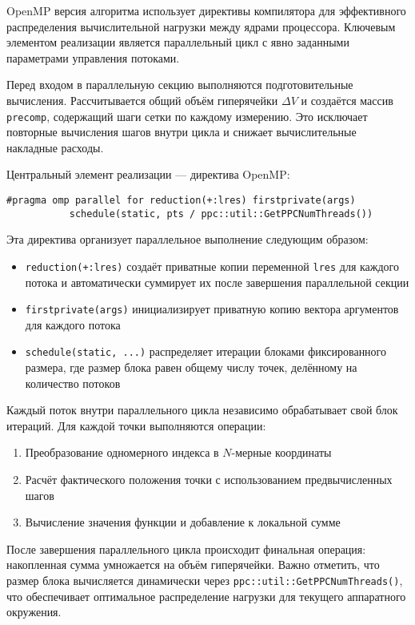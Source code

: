 \documentclass[12pt,a4paper]{extarticle}
\begin{document}
OpenMP версия алгоритма использует директивы компилятора для эффективного распределения вычислительной нагрузки между ядрами процессора. Ключевым элементом реализации является параллельный цикл с явно заданными параметрами управления потоками.

Перед входом в параллельную секцию выполняются подготовительные вычисления. Рассчитывается общий объём гиперячейки $\Delta V$ и создаётся массив \texttt{precomp}, содержащий шаги сетки по каждому измерению. Это исключает повторные вычисления шагов внутри цикла и снижает вычислительные накладные расходы.

Центральный элемент реализации — директива OpenMP:
\begin{verbatim}
#pragma omp parallel for reduction(+:lres) firstprivate(args) 
           schedule(static, pts / ppc::util::GetPPCNumThreads())
\end{verbatim}
Эта директива организует параллельное выполнение следующим образом:
\begin{itemize}
    \item \texttt{reduction(+:lres)} создаёт приватные копии переменной \texttt{lres} для каждого потока и автоматически суммирует их после завершения параллельной секции
    \item \texttt{firstprivate(args)} инициализирует приватную копию вектора аргументов для каждого потока
    \item \texttt{schedule(static, ...)} распределяет итерации блоками фиксированного размера, где размер блока равен общему числу точек, делённому на количество потоков
\end{itemize}

Каждый поток внутри параллельного цикла независимо обрабатывает свой блок итераций. Для каждой точки выполняются операции:
\begin{enumerate}
    \item Преобразование одномерного индекса в $N$-мерные координаты
    \item Расчёт фактического положения точки с использованием предвычисленных шагов
    \item Вычисление значения функции и добавление к локальной сумме
\end{enumerate}

После завершения параллельного цикла происходит финальная операция: накопленная сумма умножается на объём гиперячейки. Важно отметить, что размер блока вычисляется динамически через \texttt{ppc::util::GetPPCNumThreads()}, что обеспечивает оптимальное распределение нагрузки для текущего аппаратного окружения.
\end{document}
